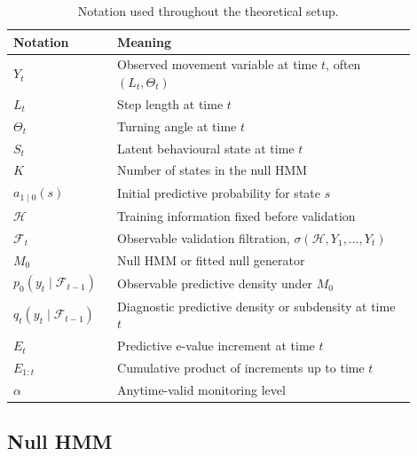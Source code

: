 \documentclass[pdflatex,sn-basic]{sn-jnl}
\theoremstyle{thmstyleone}
\theoremstyle{thmstyletwo}
\theoremstyle{thmstylethree}
\newcommand{\1}{\mathbf 1}
\newcommand{\calF}{\mathcal F}
\newcommand{\calH}{\mathcal H}
\begin{document}
\begin{table}[t]
\centering
\begin{tabular}{>{\raggedright\arraybackslash}p{0.22\linewidth}>{\raggedright\arraybackslash}p{0.68\linewidth}}
\toprule
Notation & Meaning \\
\midrule
$Y_t$ & Observed movement variable at time $t$, often $(L_t,\Theta_t)$ \\
$L_t$ & Step length at time $t$ \\
$\Theta_t$ & Turning angle at time $t$ \\
$S_t$ & Latent behavioural state at time $t$ \\
$K$ & Number of states in the null HMM \\
$a_{1\mid 0}(s)$ & Initial predictive probability for state $s$ \\
$\calH$ & Training information fixed before validation \\
$\calF_t$ & Observable validation filtration, $\sigma(\calH,Y_1,\ldots,Y_t)$ \\
$M_0$ & Null HMM or fitted null generator \\
$p_0(y_t\mid\calF_{t-1})$ & Observable predictive density under $M_0$ \\
$q_t(y_t\mid\calF_{t-1})$ & Diagnostic predictive density or subdensity at time $t$ \\
$E_t$ & Predictive e-value increment at time $t$ \\
$E_{1:t}$ & Cumulative product of increments up to time $t$ \\
$\alpha$ & Anytime-valid monitoring level \\
\bottomrule
\end{tabular}
\caption{Notation used throughout the theoretical setup.}
\label{tab:notation}
\end{table}

\subsection{Null HMM}
\end{document}
